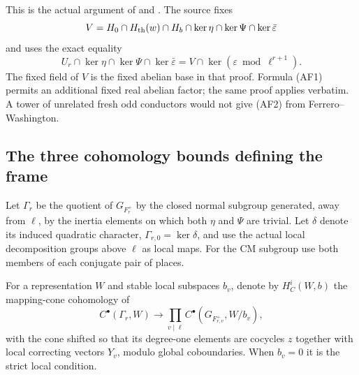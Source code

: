 This is the actual argument of
and .
The source fixes
\[
 V=H_0\cap H_{\rm th}(w)\cap H_b\cap
                         \ker\eta\cap\ker\Psi\cap\ker\bar\varepsilon
\]
and uses the exact equality
\[
 U_r\cap\ker\eta\cap\ker\Psi\cap\ker\bar\varepsilon
              =V\cap\ker(\varepsilon\bmod\ell^{r+1}).           \tag{AF3}
\]
The fixed field of \(V\) is the fixed abelian base in
that proof.  Formula (AF1) permits an additional fixed
real abelian factor; the same proof applies verbatim.
A tower of unrelated fresh odd conductors would not
give (AF2) from Ferrero--Washington.

\subsection{The three cohomology bounds defining the frame}
Let \(\Gamma_r\) be the quotient of \(G_{F_r^+}\) by the
closed normal subgroup generated, away from \(\ell\), by
the inertia elements on which both \(\eta\) and \(\Psi\)
are trivial.
Let \(\delta\) denote its induced quadratic character,
\(\Gamma_{r,0}=\ker\delta\), and use the actual local
decomposition groups above \(\ell\) as local maps.
For the CM subgroup use both members of each conjugate
pair of places.

For a representation \(W\) and stable local subspaces
\(b_v\), denote by \(H_C^i(W,b)\) the mapping-cone
cohomology of
\[
 C^\bullet(\Gamma_r,W)\longrightarrow
          \prod_{v\mid\ell}C^\bullet(G_{F_{r,v}^+},W/b_v),
\]
with the cone shifted so that its degree-one elements
are cocycles \(z\) together with local correcting
vectors \(Y_v\), modulo global coboundaries.
When \(b_v=0\) it is the strict local condition.


